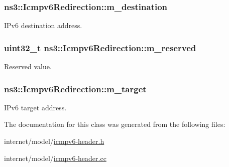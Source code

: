 \subsubsection[{\texorpdfstring{m\+\_\+destination}{m_destination}}]{ ns3\+::\+Icmpv6\+Redirection\+::m\+\_\+destination\hspace{0.3cm}{\ttfamily [private]}}\hypertarget{classns3_1_1Icmpv6Redirection_a0df467540aa03eb82b76daa1905b5d7e}{}\label{classns3_1_1Icmpv6Redirection_a0df467540aa03eb82b76daa1905b5d7e}


I\+Pv6 destination address. 

\subsubsection[{\texorpdfstring{m\+\_\+reserved}{m_reserved}}]{\setlength{\rightskip}{0pt plus 5cm}uint32\+\_\+t ns3\+::\+Icmpv6\+Redirection\+::m\+\_\+reserved\hspace{0.3cm}{\ttfamily [private]}}\hypertarget{classns3_1_1Icmpv6Redirection_af36c40a4afb2797bb42114eb4d873ee3}{}\label{classns3_1_1Icmpv6Redirection_af36c40a4afb2797bb42114eb4d873ee3}


Reserved value. 

\subsubsection[{\texorpdfstring{m\+\_\+target}{m_target}}]{ ns3\+::\+Icmpv6\+Redirection\+::m\+\_\+target\hspace{0.3cm}{\ttfamily [private]}}\hypertarget{classns3_1_1Icmpv6Redirection_a02922d245b49632f1705dff98390d8bc}{}\label{classns3_1_1Icmpv6Redirection_a02922d245b49632f1705dff98390d8bc}


I\+Pv6 target address. 



The documentation for this class was generated from the following files\+:\begin{DoxyCompactItemize}
\item 
internet/model/\hyperlink{icmpv6-header_8h}{icmpv6-\/header.\+h}\item 
internet/model/\hyperlink{icmpv6-header_8cc}{icmpv6-\/header.\+cc}\end{DoxyCompactItemize}
